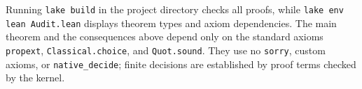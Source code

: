 \documentclass[11pt,a4paper]{article}
\numberwithin{equation}{section}
\theoremstyle{definition}
\newcommand{\code}[1]{\nolinkurl{#1}}
\begin{document}
Running \texttt{lake build} in the project directory checks all proofs, while \texttt{lake env lean Audit.lean} displays theorem types and axiom dependencies. The main theorem and the consequences above depend only on the standard axioms \code{propext}, \code{Classical.choice}, and \code{Quot.sound}. They use no \code{sorry}, custom axioms, or \code{native_decide}; finite decisions are established by proof terms checked by the kernel.

\clearpage


\end{document}
